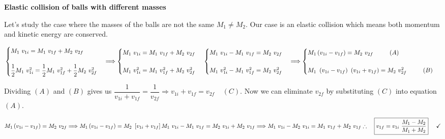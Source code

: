 \documentclass[fleqn]{article}
\begin{document}
\textbf{Elastic collision of balls with different masses}

\vspace{10px}

Let's study the case where the masses of the balls are not the same $M_1 \neq M_2$. Our case is an elastic collision
which means both momentum and kinetic energy are conserved. 

$
  \\
  \\
  \begin{cases}
    M_1 ~ v_{1i}=M_1 ~ v_{1f}+M_2 ~ v_{2f}  
    \\
    \\
    \dfrac{1}{2} M_1 ~ v_{1i}^2=\dfrac{1}{2} M_1 ~ v_{1f}^2+\dfrac{1}{2} M_2 ~ v_{2f}^2  
  \end{cases}
  \Longrightarrow 
  \begin{cases}
    M_1 ~ v_{1i}=M_1 ~ v_{1f}+M_2 ~ v_{2f}
    \\
    \\
    M_1 ~ v_{1i}^2=M_1 ~ v_{1f}^2+M_2 ~ v_{2f}^2
  \end{cases}
  \\
  \\
  \\
  \\
  \begin{cases}
    M_1 ~ v_{1i}-M_1 ~ v_{1f}=M_2 ~ v_{2f}
    \\
    \\
    M_1 ~ v_{1i}^2-M_1 ~ v_{1f}^2=M_2 ~ v_{2f}^2
  \end{cases}
  \Longrightarrow
  \begin{cases}
    M_1\left(v_{1i}-v_{1f}\right)=M_2 ~ v_{2f} ~~~~~~~~ (A)
    \\
    \\
    M_1 ~ \left(v_{1i}-v_{1f}\right) ~ \left(v_{1i}+v_{1f}\right)=M_2 ~ v_{2f}^2 ~~~~~~~~ (B)
  \end{cases}
  \\
  \\
$

Dividing $(A)$ and $(B)$ gives us $\dfrac{1}{v_{1i}+v_{1f}}=\dfrac{1}{v_{2f}} \Longrightarrow v_{1i}+v_{1f}=v_{2f} ~~~~~ (C)$.
Now we can eliminate $v_{2f}$ by substituting $(C)$ into equation $(A)$.

$
  \\
  M_1\left(v_{1i}-v_{1f}\right)=M_2 ~ v_{2f}
  \Longrightarrow
  M_1\left(v_{1i}-v_{1f}\right)=M_2 ~ \left[v_{1i}+v_{1f}\right]
  \\
  \\
  M_1 ~ v_{1i}-M_1 ~ v_{1f}=M_2 ~ v_{1i}+M_2 ~ v_{1f} 
  \Longrightarrow 
  M_1 ~ v_{1i}-M_2 ~ v_{1i}=M_1 ~ v_{1f}+M_2 ~ v_{1f}
  \\
  \\
  \\
  \therefore ~~~ \boxed{v_{1f}=v_{1i} ~ \dfrac{M_1 - M_2}{M_1+M_2}} ~~~~ \checkmark
  \\
  \\
$
\end{document}
